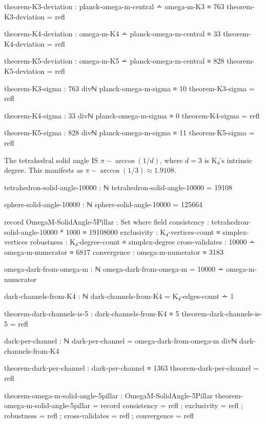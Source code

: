 \documentclass[11pt,a4paper]{book}
\begin{document}
\begin{code}
theorem-K3-deviation : planck-omega-m-central ∸ omega-m-K3 ≡ 763
theorem-K3-deviation = refl

theorem-K4-deviation : omega-m-K4 ∸ planck-omega-m-central ≡ 33
theorem-K4-deviation = refl

theorem-K5-deviation : omega-m-K5 ∸ planck-omega-m-central ≡ 828
theorem-K5-deviation = refl

theorem-K3-sigma : 763 divℕ planck-omega-m-sigma ≡ 10
theorem-K3-sigma = refl

theorem-K4-sigma : 33 divℕ planck-omega-m-sigma ≡ 0
theorem-K4-sigma = refl

theorem-K5-sigma : 828 divℕ planck-omega-m-sigma ≡ 11
theorem-K5-sigma = refl
\end{code}

The tetrahedral solid angle IS $\pi - \arccos(1/d)$, where $d = 3$ is K₄'s intrinsic degree.
This manifests as $\pi - \arccos(1/3) \approx 1.9108$.

\begin{code}
tetrahedron-solid-angle-10000 : ℕ
tetrahedron-solid-angle-10000 = 19108
\end{code}

\begin{code}
sphere-solid-angle-10000 : ℕ
sphere-solid-angle-10000 = 125664
\end{code}

\begin{code}
record OmegaM-SolidAngle-5Pillar : Set where
  field
    consistency     : tetrahedron-solid-angle-10000 * 1000 ≡ 19108000
    exclusivity     : K₄-vertices-count ≡ simplex-vertices
    robustness      : K₄-degree-count ≡ simplex-degree
    cross-validates : 10000 ∸ omega-m-numerator ≡ 6817
    convergence     : omega-m-numerator ≡ 3183

omega-dark-from-omega-m : ℕ
omega-dark-from-omega-m = 10000 ∸ omega-m-numerator

dark-channels-from-K4 : ℕ
dark-channels-from-K4 = K₄-edges-count ∸ 1

theorem-dark-channels-is-5 : dark-channels-from-K4 ≡ 5
theorem-dark-channels-is-5 = refl

dark-per-channel : ℕ
dark-per-channel = omega-dark-from-omega-m divℕ dark-channels-from-K4

theorem-dark-per-channel : dark-per-channel ≡ 1363
theorem-dark-per-channel = refl

theorem-omega-m-solid-angle-5pillar : OmegaM-SolidAngle-5Pillar
theorem-omega-m-solid-angle-5pillar = record
  { consistency     = refl
  ; exclusivity     = refl
  ; robustness      = refl
  ; cross-validates = refl
  ; convergence     = refl
  }
\end{code}
\end{document}
